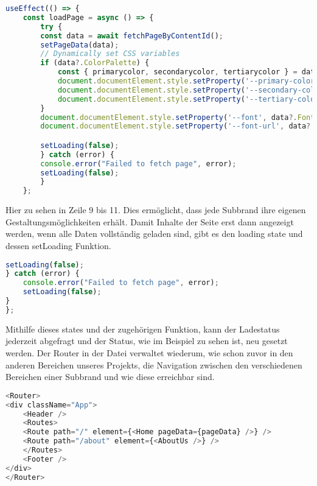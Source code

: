 \begin{lstlisting}[language=JavaScript, caption={App.jsx useEffect-Funktion}, label={lst:appSubbrandsUseEffectFunktion}]
useEffect(() => {
    const loadPage = async () => {
        try {
        const data = await fetchPageByContentId();
        setPageData(data);
        // Dynamically set CSS variables
        if (data?.ColorPalette) {
            const { primarycolor, secondarycolor, tertiarycolor } = data.ColorPalette;
            document.documentElement.style.setProperty('--primary-color', primarycolor);
            document.documentElement.style.setProperty('--secondary-color', secondarycolor);
            document.documentElement.style.setProperty('--tertiary-color', tertiarycolor);
        }
        document.documentElement.style.setProperty('--font', data?.Font || '');
        document.documentElement.style.setProperty('--font-url', data?.FontURL || '');

        setLoading(false);
        } catch (error) {
        console.error("Failed to fetch page", error);
        setLoading(false);
        }
    };
\end{lstlisting}

Hier zu sehen in Zeile 9 bis 11. Dies ermöglicht, dass jede Subbrand ihre eigenen Gestaltungsmöglichkeiten erhält.
Damit Inhalte der Seite erst dann angezeigt werden, wenn alle Daten vollständig geladen sind, gibt es den loading state und dessen setLoading Funktion.

\begin{lstlisting}[language=JavaScript, caption={App.jsx setLoading}, label={lst:appjsxSetLoading}]
setLoading(false);
} catch (error) {
    console.error("Failed to fetch page", error);
    setLoading(false);
}
};
\end{lstlisting}

Mithilfe dieses states und der zugehörigen Funktion, kann der Ladestatus jederzeit abgefragt und der Status, wie im Beispiel zu sehen ist, neu gesetzt werden.
Der Router in der Datei verwaltet wiederum, wie schon zuvor in den anderen Bereichen unseres Projekts, die Navigation zwischen den verschiedenen Bereichen einer Subbrand und wie diese erreichbar sind.

\begin{lstlisting}[language=JavaScript, caption={App.jsx Router}, label={lst:appjsxRouter}]
<Router>
<div className="App">
    <Header />
    <Routes>
    <Route path="/" element={<Home pageData={pageData} />} />
    <Route path="/about" element={<AboutUs />} />
    </Routes>
    <Footer />
</div>
</Router>
\end{lstlisting}